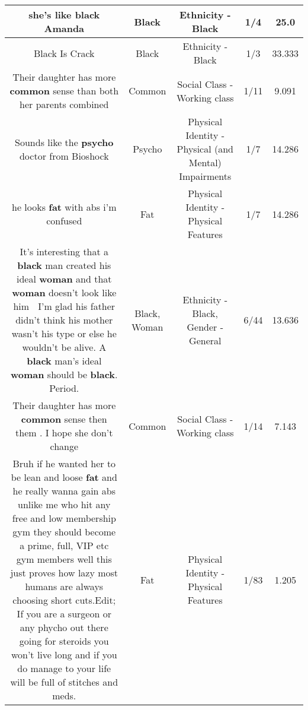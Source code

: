 \documentclass[11pt]{article}
\newlength\mylength
\begin{document}
\begin{center}
\begin{longtable}{|C{.65\mylength}|C{.30\mylength}|C{.12\mylength}|C{.12\mylength}|C{.12\mylength}|}
  \small she's like \textbf{black} Amanda\normalsize   & Black & Ethnicity - Black & 1/4 & 25.0 \\  \hline
  \small Black Is Crack\normalsize   & Black & Ethnicity - Black & 1/3 & 33.333 \\  \hline
  \small Their daughter has more \textbf{common} sense than both her parents combined\normalsize   & Common & Social Class - Working class & 1/11 & 9.091 \\  \hline
  \small Sounds like the \textbf{psycho} doctor from Bioshock\normalsize   & Psycho & Physical Identity - Physical (and Mental) Impairments & 1/7 & 14.286 \\  \hline
  \small he looks \textbf{fat} with abs i'm confused\normalsize   & Fat & Physical Identity - Physical Features & 1/7 & 14.286 \\  \hline
  \small It's interesting that a \textbf{black} man created his ideal \textbf{woman} and that \textbf{woman} doesn't look like him 🤔 I'm glad his father didn't think his mother wasn't his type or else he wouldn't be alive. A \textbf{black} man's ideal \textbf{woman} should be \textbf{black}. Period.\normalsize   & Black, Woman & Ethnicity - Black, Gender - General & 6/44 & 13.636 \\  \hline
  \small Their daughter has more \textbf{common} sense then them . I hope she don't change\normalsize   & Common & Social Class - Working class & 1/14 & 7.143 \\  \hline
  \small Bruh if he wanted her to be lean and loose \textbf{fat} and he really wanna gain abs unlike me who hit any free and low membership gym they should become a prime, full, VIP etc gym members well this just proves how lazy most humans are always choosing short cuts.Edit; If you are a surgeon or any phycho out there going for steroids you won't live long and if you do manage to your life will be full of stitches and meds.\normalsize   & Fat & Physical Identity - Physical Features & 1/83 & 1.205 \\  \hline

\end{longtable}
\end{center}
\end{document}
